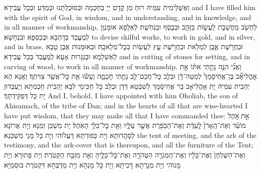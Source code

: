 {וְאַשְׁלֵימִית עִמֵּיהּ רוּחַ מִן קֳדָם יְיָ בְּחָכְמָה וּבְסוּכְלְתָנוּ וּבְמַדַּע וּבְכָל עֲבִידָא׃}
{and I have filled him with the spirit of God, in wisdom, and in understanding, and in knowledge, and in all manner of workmanship,}{}
{לַחְשֹׁ֖ב מַחֲשָׁבֹ֑ת לַעֲשׂ֛וֹת בַּזָּהָ֥ב וּבַכֶּ֖סֶף וּבַנְּחֹֽשֶׁת׃
}
{לְאַלָּפָא אוּמָּנְוָן לְמֶעֱבַד בְּדַהְבָּא וּבְכַסְפָּא וּבִנְחָשָׁא׃}
{to devise skilful works, to work in gold, and in silver, and in brass,}{}
{וּבַחֲרֹ֥שֶׁת אֶ֛בֶן לְמַלֹּ֖את וּבַחֲרֹ֣שֶׁת עֵ֑ץ לַעֲשׂ֖וֹת בְּכׇל־מְלָאכָֽה׃
}
{וּבְאוּמָּנוּת אֶבֶן טָבָא לְאַשְׁלָמָא וּבְנַגָּרוּת אָעָא לְמֶעֱבַד בְּכָל עֲבִידָא׃}
{and in cutting of stones for setting, and in carving of wood, to work in all manner of workmanship.}{}
{וַאֲנִ֞י הִנֵּ֧ה נָתַ֣תִּי אִתּ֗וֹ אֵ֣ת אׇהֳלִיאָ֞ב בֶּן־אֲחִֽיסָמָךְ֙ לְמַטֵּה־דָ֔ן וּבְלֵ֥ב כׇּל־חֲכַם־לֵ֖ב נָתַ֣תִּי חׇכְמָ֑ה וְעָשׂ֕וּ אֵ֖ת כׇּל־אֲשֶׁ֥ר צִוִּיתִֽךָ׃
}
{וַאֲנָא הָא יְהַבִית עִמֵּיהּ יָת אָהֳלִיאָב בַּר אֲחִיסָמָךְ לְשִׁבְטָא דְּדָן וּבְלֵב כָּל חַכִּימֵי לִבָּא יְהַבִית חָכְמְתָא וְיַעְבְּדוּן יָת כָּל דְּפַקֵּידְתָּךְ׃}
{And I, behold, I have appointed with him Oholiab, the son of Ahisamach, of the tribe of Dan; and in the hearts of all that are wise-hearted I have put wisdom, that they may make all that I have commanded thee:}{}
{אֵ֣ת \legarmeh  אֹ֣הֶל מוֹעֵ֗ד וְאֶת־הָֽאָרֹן֙ לָֽעֵדֻ֔ת וְאֶת־הַכַּפֹּ֖רֶת אֲשֶׁ֣ר עָלָ֑יו וְאֵ֖ת כׇּל־כְּלֵ֥י הָאֹֽהֶל׃
}
{יָת מַשְׁכַּן זִמְנָא וְיָת אֲרוֹנָא לְסָהֲדוּתָא וְיָת כָּפוּרְתָּא דַּעֲלוֹהִי וְיָת כָּל מָנֵי מַשְׁכְּנָא׃}
{the tent of meeting, and the ark of the testimony, and the ark-cover that is thereupon, and all the furniture of the Tent;}{}
{וְאֶת־הַשֻּׁלְחָן֙ וְאֶת־כֵּלָ֔יו וְאֶת־הַמְּנֹרָ֥ה הַטְּהֹרָ֖ה וְאֶת־כׇּל־כֵּלֶ֑יהָ וְאֵ֖ת מִזְבַּ֥ח הַקְּטֹֽרֶת׃
}
{וְיָת פָּתוּרָא וְיָת מָנוֹהִי וְיָת מְנָרְתָא דָּכִיתָא וְיָת כָּל מָנַהָא וְיָת מַדְבְּחָא דִּקְטֹרֶת בּוּסְמַיָּא׃}
